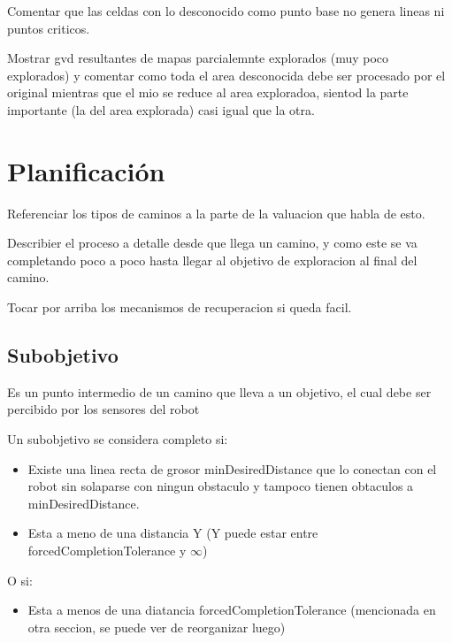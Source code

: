 Comentar que las celdas con lo desconocido como punto base no genera lineas ni
puntos criticos.


Mostrar gvd resultantes de mapas parcialemnte explorados (muy poco explorados) y comentar como toda el area desconocida debe ser procesado por el original mientras que el mio se reduce al area exploradoa, sientod la parte importante (la del area explorada) casi igual que la otra.






\section{Planificación}
Referenciar los tipos de caminos a la parte de la valuacion que habla de esto.

Describier el proceso a detalle desde que llega un camino, y como este se va
completando poco a poco hasta llegar al objetivo de exploracion al final del
camino.

Tocar por arriba los mecanismos de recuperacion si queda facil.

\subsection{Subobjetivo}
Es un punto intermedio de un camino que lleva a un objetivo, el cual debe ser percibido por los sensores del robot

Un subobjetivo se considera completo si:
\begin{itemize}
  \item Existe una linea recta de grosor minDesiredDistance que lo conectan con
    el robot sin solaparse con ningun obstaculo y tampoco tienen obtaculos a
    minDesiredDistance. 
  \item Esta a meno de una distancia Y (Y puede estar entre
    forcedCompletionTolerance y $\infty$)
\end{itemize}
O si:
\begin{itemize}
  \item Esta a menos de una diatancia forcedCompletionTolerance (mencionada en otra seccion, se puede ver de reorganizar luego)
\end{itemize}

